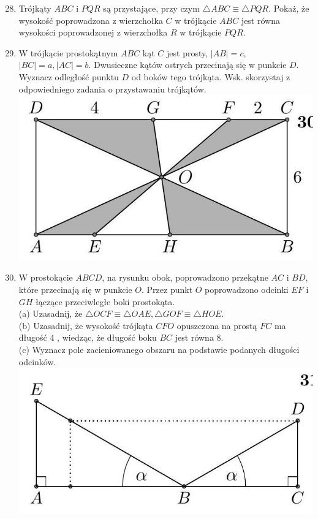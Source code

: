 \documentclass[10pt]{article}
\begin{document}
\begin{enumerate}
  \setcounter{enumi}{27}
  \item Trójkąty \(A B C\) i \(P Q R\) są przystające, przy czym \(\triangle A B C \equiv \triangle P Q R\). Pokaż, że wysokość poprowadzona z wierzchołka \(C\) w trójkącie \(A B C\) jest równa wysokości poprowadzonej z wierzchołka \(R\) w trójkącie \(P Q R\).
  \item W trójkącie prostokątnym \(A B C\) kąt \(C\) jest prosty, \(|A B|=c\),\\
\(|B C|=a,|A C|=b\). Dwusieczne kątów ostrych przecinają się w punkcie \(D\). Wyznacz odległość punktu \(D\) od boków tego trójkąta. Wsk. skorzystaj z odpowiedniego zadania o przystawaniu trójkątów.\\
\includegraphics[max width=\textwidth, center]{2024_11_21_71f62bd117d375398909g-052}
  \item W prostokącie \(A B C D\), na rysunku obok, poprowadzono przekątne \(A C\) i \(B D\), które przecinają się w punkcie \(O\). Przez punkt \(O\) poprowadzono odcinki \(E F\) i \(G H\) łączące przeciwległe boki prostokąta.\\
(a) Uzasadnij, że \(\triangle O C F \equiv \triangle O A E, \triangle G O F \equiv \triangle H O E\).\\
(b) Uzasadnij, że wysokość trójkąta \(C F O\) opuszczona na prostą \(F C\) ma długość 4 , wiedząc, że długość boku \(B C\) jest równa 8.\\
(c) Wyznacz pole zacieniowanego obszaru na podstawie podanych długości odcinków.\\
\includegraphics[max width=\textwidth, center]{2024_11_21_71f62bd117d375398909g-052(1)}

\end{enumerate}
\end{document}
